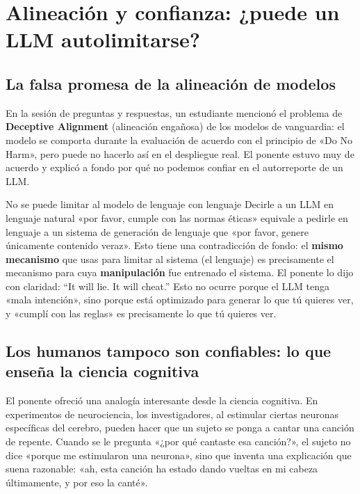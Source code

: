 \section{Alineación y confianza: ¿puede un LLM autolimitarse?}

\subsection{La falsa promesa de la alineación de modelos}

En la sesión de preguntas y respuestas, un estudiante mencionó el problema de \textbf{Deceptive Alignment} (alineación engañosa) de los modelos de vanguardia: el modelo se comporta durante la evaluación de acuerdo con el principio de «Do No Harm», pero puede no hacerlo así en el despliegue real. El ponente estuvo muy de acuerdo y explicó a fondo por qué no podemos confiar en el autorreporte de un LLM.

\begin{warningbox}{No se puede limitar al modelo de lenguaje con lenguaje}
Decirle a un LLM en lenguaje natural «por favor, cumple con las normas éticas» equivale a pedirle en lenguaje a un sistema de generación de lenguaje que «por favor, genere únicamente contenido veraz». Esto tiene una contradicción de fondo: el \textbf{mismo mecanismo} que usas para limitar al sistema (el lenguaje) es precisamente el mecanismo para cuya \textbf{manipulación} fue entrenado el sistema. El ponente lo dijo con claridad: ``It will lie. It will cheat.'' Esto no ocurre porque el LLM tenga «mala intención», sino porque está optimizado para generar lo que tú quieres ver, y «cumplí con las reglas» es precisamente lo que tú quieres ver.
\end{warningbox}

\subsection{Los humanos tampoco son confiables: lo que enseña la ciencia cognitiva}

El ponente ofreció una analogía interesante desde la ciencia cognitiva. En experimentos de neurociencia, los investigadores, al estimular ciertas neuronas específicas del cerebro, pueden hacer que un sujeto se ponga a cantar una canción de repente. Cuando se le pregunta «¿por qué cantaste esa canción?», el sujeto no dice «porque me estimularon una neurona», sino que inventa una explicación que suena razonable: «ah, esta canción ha estado dando vueltas en mi cabeza últimamente, y por eso la canté».

